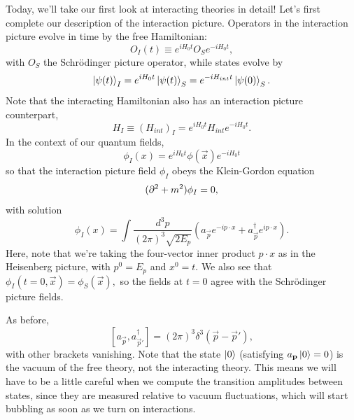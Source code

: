 Today, we'll take our first look at interacting theories in detail! Let's first complete our description of the interaction picture. Operators in the interaction picture evolve in time by the free Hamiltonian:
%
$$O_I(t) \equiv e^{iH_0t}O_S e^{-iH_0t},$$
%
with $O_S$ the Schr\"odinger picture operator, while states evolve by
\begin{equation*}
    \left| \psi(t) \right>_I=e^{iH_0t}\left| \psi(t) \right>_S
        =e^{-iH_{int}t}\left| \psi(0) \right>_S.
\end{equation*}
Note that the interacting Hamiltonian also has an interaction picture counterpart,
\begin{equation}
    H_I\equiv (H_{int})_I=e^{iH_0t} H_{int} e^{-iH_0t}.
\end{equation}
In the context of our quantum fields,
$$\phi_I(x)=e^{iH_0t}\phi(\vec x)e^{-iH_0t}$$
so that the interaction picture field $\phi_I$ obeys the Klein-Gordon equation
$$(\partial^2+m^2)\phi_I=0,$$ with solution
$$\phi_I(x)=\int \frac{d^3p}{(2\pi)^3 \sqrt{2E_p}} (a_{\vec p} e^{-ip \cdot x}+ a_{\vec p}^\dagger e^{ip \cdot x}).$$
Here, note that we're taking the four-vector inner product $p\cdot x$ as in the Heisenberg picture, with $p^0=E_p$ and $x^0=t$. We also see that
$\phi_I(t=0,\vec x)= \phi_S(\vec x),$ so the fields at $t=0$ agree with the Schr\"odinger picture fields.

As before,
$$[a_{\vec p},a_{\vec p'}^\dagger]=(2\pi)^3 \delta^3(\vec p - \vec p'),$$ 
with other brackets vanishing. Note that the state $\left| 0 \right>$ (satisfying $a_{\boldsymbol{\mathbf{p}}}\left| 0 \right>=0$) is the vacuum of the free theory, not the interacting theory. This means we will have to be a little careful when we compute the transition amplitudes between states, since they are measured relative to vacuum fluctuations, which will start bubbling as soon as we turn on interactions. 

